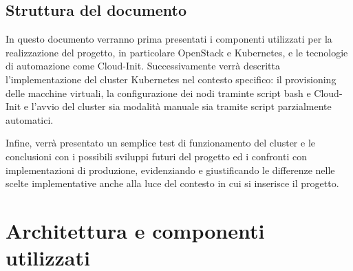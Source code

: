 \documentclass[12pt,a4paper,openright,twoside]{book}
\begin{document}
\section{Struttura del documento}
In questo documento verranno prima presentati i componenti utilizzati per la realizzazione del progetto, in particolare OpenStack e Kubernetes, e le tecnologie di automazione come Cloud-Init.
Successivamente verrà descritta l'implementazione del cluster Kubernetes nel contesto specifico: il provisioning delle macchine virtuali, la configurazione dei nodi traminte script bash e Cloud-Init
e l'avvio del cluster sia modalità manuale sia tramite script parzialmente automatici.

Infine, verrà presentato un semplice test di funzionamento del cluster e le conclusioni con i possibili sviluppi futuri del progetto ed i confronti con implementazioni di produzione, evidenziando e giustificando
le differenze nelle scelte implementative anche alla luce del contesto in cui si inserisce il progetto.
\chapter{Architettura e componenti utilizzati}
\end{document}
